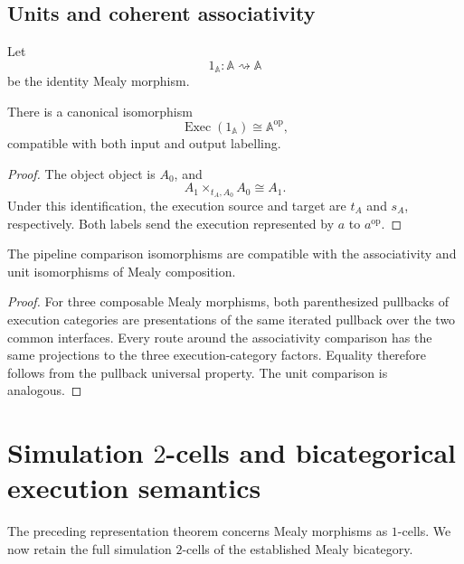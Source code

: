 \subsection{Units and coherent associativity}
\label{subsec:execution-units-coherence}

Let
\[
    1_{\mathbb A}:\mathbb A\rightsquigarrow\mathbb A
\]
be the identity Mealy morphism.

\begin{proposition}
\label{prop:execution-unit}
There is a canonical isomorphism
\[
    \operatorname{Exec}(1_{\mathbb A})
    \cong
    \mathbb A^{\mathrm{op}},
\]
compatible with both input and output labelling.
\end{proposition}

\begin{proof}
The object object is \(A_0\), and
\[
    A_1\times_{t_A,A_0}A_0
    \cong
    A_1.
\]
Under this identification, the execution source and target are \(t_A\) and
\(s_A\), respectively. Both labels send the execution represented by \(a\)
to \(a^{\mathrm{op}}\).
\end{proof}

\begin{proposition}
\label{prop:coherence-execution-pullbacks}
The pipeline comparison isomorphisms are compatible with the associativity
and unit isomorphisms of Mealy composition.
\end{proposition}

\begin{proof}
For three composable Mealy morphisms, both parenthesized pullbacks of
execution categories are presentations of the same iterated pullback over
the two common interfaces. Every route around the associativity comparison
has the same projections to the three execution-category factors. Equality
therefore follows from the pullback universal property. The unit comparison
is analogous.
\end{proof}

\section{Simulation \(2\)-cells and bicategorical execution semantics}
\label{sec:simulation-two-cells-execution}

The preceding representation theorem concerns Mealy morphisms as
\(1\)-cells. We now retain the full simulation \(2\)-cells of the established
Mealy bicategory.

